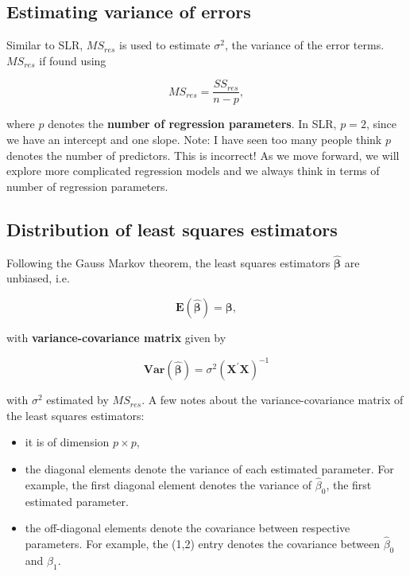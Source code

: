 \documentclass[
]{book}
\providecommand{\tightlist}{%
  \setlength{\itemsep}{0pt}\setlength{\parskip}{0pt}}
\begin{document}
\hypertarget{estimating-variance-of-errors}{%
\subsection{Estimating variance of errors}\label{estimating-variance-of-errors}}

Similar to SLR, \(MS_{res}\) is used to estimate \(\sigma^2\), the variance of the error terms. \(MS_{res}\) if found using

\begin{equation}
MS_{res}=\frac{SS_{res}}{n-p},
\label{eq:6MSres}
\end{equation}

where \(p\) denotes the \textbf{number of regression parameters}. In SLR, \(p=2\), since we have an intercept and one slope. Note: I have seen too many people think \(p\) denotes the number of predictors. This is incorrect! As we move forward, we will explore more complicated regression models and we always think in terms of number of regression parameters.

\hypertarget{distribution-of-least-squares-estimators-1}{%
\subsection{Distribution of least squares estimators}\label{distribution-of-least-squares-estimators-1}}

Following the Gauss Markov theorem, the least squares estimators \(\boldsymbol{\hat{\beta}}\) are unbiased, i.e.

\begin{equation} 
\boldsymbol{E\left(\hat{\beta}\right)} = \boldsymbol{\beta},
\label{eq:6mean2}
\end{equation}

with \textbf{variance-covariance matrix} given by

\begin{equation} 
\boldsymbol{Var}\left(\boldsymbol{\hat{\beta}}\right) = \sigma^{2}\left(\boldsymbol{X^{\prime}X} \right)^{-1}
\label{eq:6cov2}
\end{equation}

with \(\sigma^{2}\) estimated by \(MS_{res}\). A few notes about the variance-covariance matrix of the least squares estimators:

\begin{itemize}
\tightlist
\item
  it is of dimension \(p \times p\),
\item
  the diagonal elements denote the variance of each estimated parameter. For example, the first diagonal element denotes the variance of \(\hat{\beta}_0\), the first estimated parameter.
\item
  the off-diagonal elements denote the covariance between respective parameters. For example, the (1,2) entry denotes the covariance between \(\hat{\beta}_0\) and \(\hat{\beta}_1\).
\end{itemize}
\end{document}
